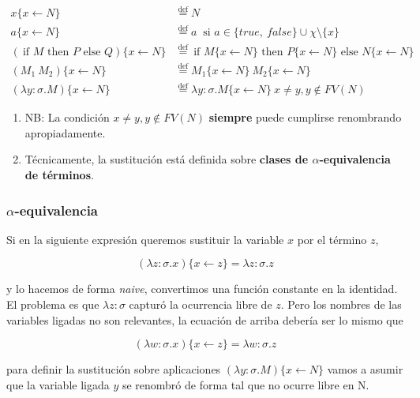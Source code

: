 \documentclass{report}
\theoremstyle{definition} %
\newcommand{\eqdef}{\overset{\text{def}}{=}}
\newcommand{\ifte}[3]{\ \text{if } #1 \text{ then } #2 \text{ else } #3}
\newcommand{\abs}[3]{\lambda #1 : #2 . #3}
\newcommand{\app}[2]{#1 \ #2} %
\newcommand{\sustOne}[3]{#1 \{ #2 \leftarrow #3 \}}
\newcommand{\fv}[1]{FV(#1)}
\begin{document}
\begin{align*}
    \sustOne{x}{x}{N} &\eqdef N \\
    \sustOne{a}{x}{N} 
        &\eqdef
        a \ \text{ si } a\in \{true,\ false \} \cup \chi \setminus \{x \} \\
    \sustOne{(\ifte{M}{P}{Q})}{x}{N}
        &\eqdef
        \ifte
            {\sustOne{M}{x}{N}}
            {\sustOne{P}{x}{N}}
            {\sustOne{N}{x}{N}} \\
    \sustOne{(\app{M_1}{M_2})}{x}{N}
        &\eqdef
        \app{\sustOne{M_1}{x}{N}}{\sustOne{M_2}{x}{N}}\\
    \sustOne{(\abs{y}{\sigma}{M})}{x}{N}
        &\eqdef
        \abs{y}{\sigma}{\sustOne{M}{x}{N}} \ x \neq y, y \notin \fv{N}
\end{align*}

\begin{enumerate}
    \item NB: La condición $x\neq y, y \notin \fv{N}$ \textbf{siempre} puede
    cumplirse renombrando apropiadamente.
    \item Técnicamente, la sustitución está definida sobre \textbf{clases de
    $\alpha$-equivalencia de términos}.
\end{enumerate}

\subsubsection{$\alpha$-equivalencia}

Si en la siguiente expresión queremos sustituir la variable $x$ por el término
$z$,

\[
    \sustOne{(\abs{z}{\sigma}{x})}{x}{z} = \abs{z}{\sigma}{z}
\]

y lo hacemos de forma \textit{naive}, convertimos una función constante en la
identidad. El problema es que $\lambda z : \sigma$ capturó la ocurrencia libre
de $z$. Pero los nombres de las variables ligadas no son relevantes, la ecuación
de arriba debería ser lo mismo que

\[
    \sustOne{(\abs{w}{\sigma}{x})}{x}{z} = \abs{w}{\sigma}{z}
\]

para definir la sustitución sobre aplicaciones
$\sustOne{(\abs{y}{\sigma}{M})}{x}{N}$ vamos a asumir que la variable ligada $y$
se renombró de forma tal que no ocurre libre en N.
\end{document}

